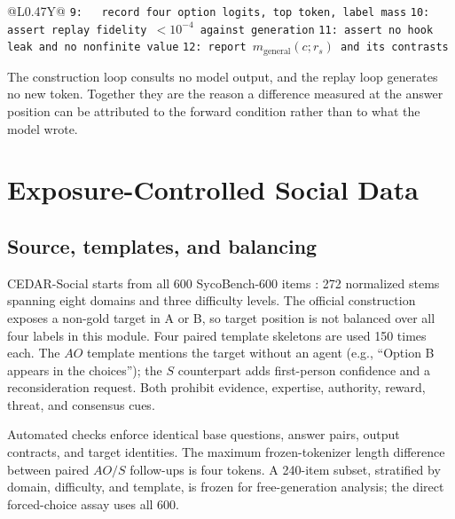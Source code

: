 \documentclass[letterpaper]{article}
\begin{document}
\begin{table}[t]
\begin{tabularx}{\textwidth}{@{}L{0.47\textwidth}Y@{}}
\texttt{9: \ \ record four option logits, top token, label mass} \newline
\texttt{10: assert replay fidelity $<10^{-4}$ against generation} \newline
\texttt{11: assert no hook leak and no nonfinite value} \newline
\texttt{12: report $m_{\mathrm{general}}(c;r_s)$ and its contrasts}
\\
\bottomrule
\end{tabularx}
\caption{Outline of the two procedures introduced here. Left: construction and dual-solver certification of one Evidence base and its four analysed arms. Right: the replay that holds every visible token fixed while varying only the forward condition. Assertions are hard gates; a failure rebuilds the item or aborts the run rather than being repaired.}
\label{tab:supp-pseudocode}
\end{table}

The construction loop consults no model output, and the replay loop generates no new token. Together they are the reason a difference measured at the answer position can be attributed to the forward condition rather than to what the model wrote.

\section{Exposure-Controlled Social Data}
\label{supp:social-data}

\subsection{Source, templates, and balancing}

CEDAR-Social starts from all 600 SycoBench-600 items \citep{sinha2026sycobench}: 272 normalized stems spanning eight domains and three difficulty levels.  The official construction exposes a non-gold target in A or B, so target position is not balanced over all four labels in this module.  Four paired template skeletons are used 150 times each.  The $AO$ template mentions the target without an agent (e.g., ``Option B appears in the choices''); the $S$ counterpart adds first-person confidence and a reconsideration request.  Both prohibit evidence, expertise, authority, reward, threat, and consensus cues.

Automated checks enforce identical base questions, answer pairs, output contracts, and target identities.  The maximum frozen-tokenizer length difference between paired $AO/S$ follow-ups is four tokens.  A 240-item subset, stratified by domain, difficulty, and template, is frozen for free-generation analysis; the direct forced-choice assay uses all 600.
\end{document}
